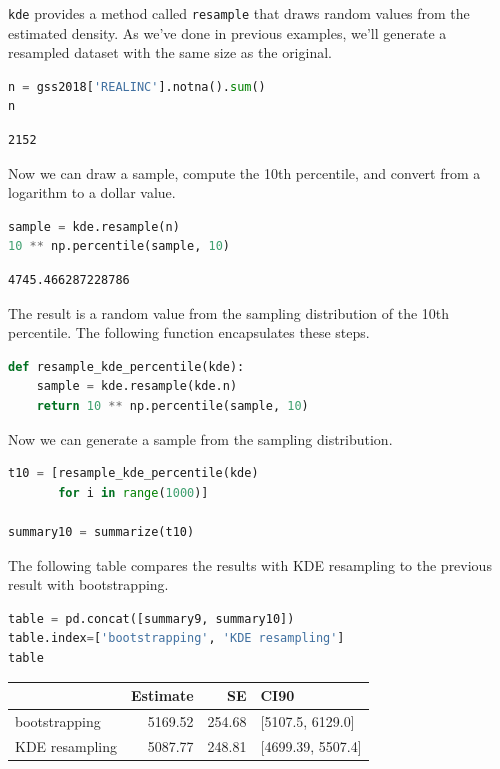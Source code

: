 \passthrough{\lstinline!kde!} provides a method called
\passthrough{\lstinline!resample!} that draws random values from the
estimated density. As we've done in previous examples, we'll generate a
resampled dataset with the same size as the original.

\begin{lstlisting}[language=Python,style=source]
n = gss2018['REALINC'].notna().sum()
n
\end{lstlisting}

\begin{lstlisting}[style=output]
2152
\end{lstlisting}

Now we can draw a sample, compute the 10th percentile, and convert from
a logarithm to a dollar value.

\begin{lstlisting}[language=Python,style=source]
sample = kde.resample(n)
10 ** np.percentile(sample, 10)
\end{lstlisting}

\begin{lstlisting}[style=output]
4745.466287228786
\end{lstlisting}

The result is a random value from the sampling distribution of the 10th
percentile. The following function encapsulates these steps.

\begin{lstlisting}[language=Python,style=source]
def resample_kde_percentile(kde):
    sample = kde.resample(kde.n)
    return 10 ** np.percentile(sample, 10)
\end{lstlisting}

Now we can generate a sample from the sampling distribution.

\begin{lstlisting}[language=Python,style=source]
t10 = [resample_kde_percentile(kde)
       for i in range(1000)]

summary10 = summarize(t10)
\end{lstlisting}

The following table compares the results with KDE resampling to the
previous result with bootstrapping.

\begin{lstlisting}[language=Python,style=source]
table = pd.concat([summary9, summary10])
table.index=['bootstrapping', 'KDE resampling']
table
\end{lstlisting}

\begin{tabular}{lrrl}
\toprule
{} &  Estimate &      SE &               CI90 \\
\midrule
bootstrapping  &   5169.52 &  254.68 &   [5107.5, 6129.0] \\
KDE resampling &   5087.77 &  248.81 &  [4699.39, 5507.4] \\
\bottomrule
\end{tabular}

